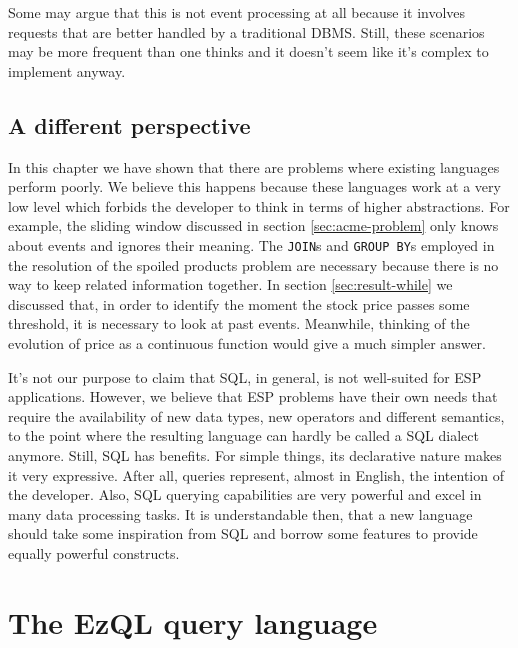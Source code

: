 \documentclass{report}
\begin{document}
Some may argue that this is not event processing at all because it
involves requests that are better handled by a traditional
DBMS. Still, these scenarios may be more frequent than one thinks and
it doesn't seem like it's complex to implement anyway.

\section{A different perspective}

In this chapter we have shown that there are problems where existing
languages perform poorly. We believe this happens because these
languages work at a very low level which forbids the developer to
think in terms of higher abstractions. For example, the sliding window
discussed in section \ref{sec:acme-problem} only knows about events and
ignores their meaning. The \verb=JOIN=s and \verb=GROUP BY=s employed
in the resolution of the spoiled products problem are necessary
because there is no way to keep related information together. In
section \ref{sec:result-while} we discussed that, in order to identify
the moment the stock price passes some threshold, it is necessary to
look at past events. Meanwhile, thinking of the evolution of price as
a continuous function would give a much simpler answer.

It's not our purpose to claim that SQL, in general, is not well-suited
for ESP applications. However, we believe that ESP problems have their
own needs that require the availability of new data types, new
operators and different semantics, to the point where the resulting
language can hardly be called a SQL dialect anymore. Still, SQL has
benefits. For simple things, its declarative nature makes it very
expressive. After all, queries represent, almost in English, the
intention of the developer. Also, SQL querying capabilities are very
powerful and excel in many data processing tasks. It is understandable
then, that a new language should take some inspiration from SQL and
borrow some features to provide equally powerful constructs.

\chapter{The EzQL query language}
\label{chap:ezql}

\lstset{
  language=EzQL,
  columns=fullflexible,
  basicstyle=\tt,
  keywordstyle=[1]\bf,
  keywordstyle=[2]\it,
}
\end{document}
